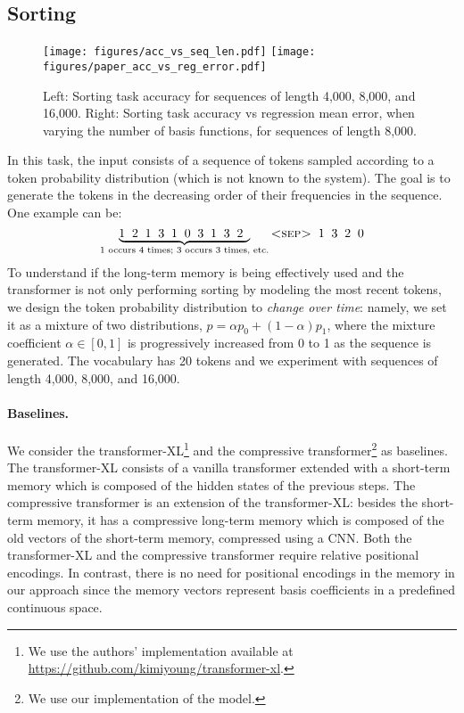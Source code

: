 \documentclass[11pt]{article}
\begin{document}
\subsection{Sorting}
\label{sec:sorting}

\begin{figure*}[t]
    \centering
    \texttt{[image: figures/acc\_vs\_seq\_len.pdf]}
    \texttt{[image: figures/paper\_acc\_vs\_reg\_error.pdf]}
    \caption{Left: Sorting task accuracy for sequences of length 4,000, 8,000, and 16,000. Right: Sorting task accuracy vs regression mean error, when varying the number of basis functions, for sequences of length 8,000.}
    \label{fig:sorting_results}
\end{figure*}

In this task, the input consists of a sequence of tokens sampled according to a token probability distribution (which is not known to the system). The goal 
is to generate the tokens in the decreasing order of their frequencies in the sequence. 
One example can be:
\begin{equation}
    \underbrace{1\;\; 2\;\; 1\;\; 3\;\; 1\;\; 0\;\; 3\;\; 1\;\; 3\;\; 2\;\;}_{\text{$1$ occurs 4 times; $3$ occurs 3 times, etc.}} \textsc{<sep>}\;\; 1\;\; 3\;\; 2\;\; 0 \nonumber
\end{equation}
To understand if the long-term memory is being effectively used and the transformer is not only performing sorting by modeling the most recent tokens, we design the token probability distribution to \emph{change over time}: namely, we set it as a mixture of two  distributions, ${p = \alpha p_0 + (1-\alpha) p_1}$, where the mixture coefficient $\alpha \in [0,1]$ is progressively increased from 0 to 1 as the sequence is generated. 
The vocabulary has 20 tokens and we experiment with sequences of length 4,000, 8,000, and 16,000. 

\paragraph{Baselines. }
We consider the transformer-XL\footnote{We use the authors' implementation available at \url{https://github.com/kimiyoung/transformer-xl}.} \citep{dai2019transformer} and the compressive transformer\footnote{We use our implementation of the model.} \citep{rae2019compressive} as baselines. The transformer-XL consists of a vanilla transformer \citep{vaswani2017attention} extended with a short-term memory which is composed of the hidden states of the previous steps. The compressive transformer is an extension of the transformer-XL: besides the short-term memory, it has a compressive long-term memory which is composed of  the old vectors of the short-term memory, compressed using a CNN. 
Both the transformer-XL and the compressive transformer require relative positional encodings. 
In contrast, there is no need for positional encodings in the memory in our approach since the memory vectors represent basis coefficients in a predefined continuous space. 
\end{document}

